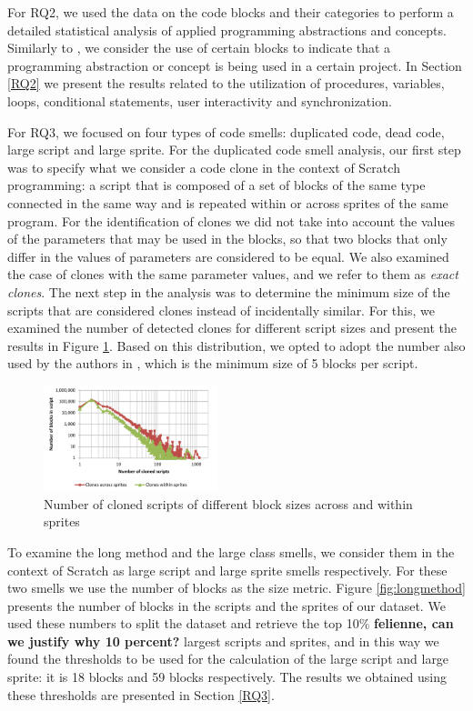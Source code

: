 \documentclass{sig-alternate}
\newcommand{\todo}[1]{\textbf{#1}}
\begin{document}
For RQ2, we used the data on the code blocks and their categories to perform a detailed statistical analysis of applied programming abstractions and concepts. Similarly to \cite{Maloney_2008}, we consider the use of certain blocks to indicate that a programming abstraction or concept is being used in a certain project. In Section \ref{RQ2} we present the results related to the utilization of procedures, variables, loops, conditional statements, user interactivity and synchronization.

For RQ3, we focused on four types of code smells: duplicated code, dead code, large script and large sprite. For the duplicated code smell analysis, our first step was to specify what we consider a code clone in the context of Scratch programming: a script that is composed of a set of blocks of the same type connected in the same way and is repeated within or across sprites of the same program. For the identification of clones we did not take into account the values of the parameters that may be used in the blocks, so that two blocks that only differ in the values of parameters are considered to be equal. We also examined the case of clones with the same parameter values, and we refer to them as \textit{exact clones}. The next step in the analysis was to determine the minimum size of the scripts that are considered clones instead of incidentally similar. For this, we examined the number of detected clones for different script sizes and present the results in Figure \ref{fig:cloneslines}. Based on this distribution, we opted to adopt the number also used by the authors in \cite{moreno_automatic_2014}, which is the minimum size of 5 blocks per script.

\begin{figure}
	\centering
	\includegraphics[width=0.45\textwidth]{fig/charts/11cloneslines}
	\caption{Number of cloned scripts of different block sizes across and within sprites}
	\label{fig:cloneslines}
\end{figure}

To examine the long method and the large class smells, we consider them in the context of Scratch as large script and large sprite smells respectively. For these two smells we use the number of blocks as the size metric. Figure \ref{fig:longmethod} presents the number of blocks in the scripts and the sprites of our dataset. We used these numbers to split the dataset and retrieve the top 10\% \todo{felienne, can we justify why 10 percent?} largest scripts and sprites, and in this way we found the thresholds to be used for the calculation of the large script and large sprite: it is 18 blocks and 59 blocks respectively. The results we obtained using these thresholds are presented in Section \ref{RQ3}.
\end{document}
